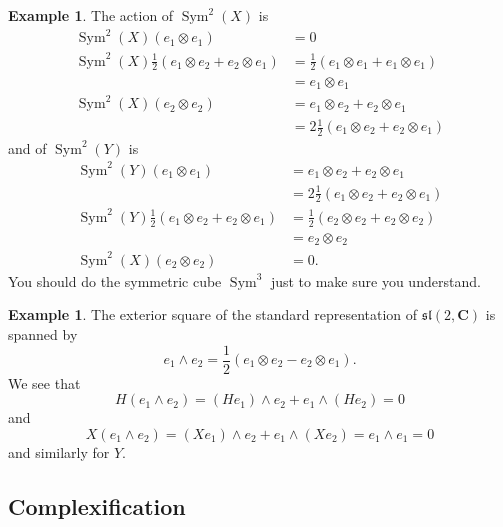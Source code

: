 \documentclass[12pt]{article}
\newcommand{\CC}{\mathbf{C}}
\newcommand{\OP}{\operatorname}
\newcommand{\Sym}{\OP{Sym}}
\theoremstyle{definition}
\newtheorem{exm}[thm]{Example}
\theoremstyle{check}
\theoremstyle{remark}
\theoremstyle{TheoremNum}
\begin{document}
\begin{exm}
The action of $\Sym^2(X)$ is
\begin{align*}
\Sym^2(X)(e_1\otimes e_1)&=0\\
\Sym^2(X)\frac{1}{2}(e_1\otimes e_2+e_2\otimes e_1)&=\frac{1}{2}(e_1\otimes e_1+e_1\otimes e_1)\\
&=e_1\otimes e_1\\
\Sym^2(X)(e_2\otimes e_2)&=e_1\otimes e_2+e_2\otimes e_1\\
&=2\frac{1}{2}(e_1\otimes e_2+e_2\otimes e_1)
\end{align*}
and of $\Sym^2(Y)$ is
\begin{align*}
\Sym^2(Y)(e_1\otimes e_1)&=e_1\otimes e_2+e_2\otimes e_1\\
&=2\frac{1}{2}(e_1\otimes e_2+e_2\otimes e_1)\\
\Sym^2(Y)\frac{1}{2}(e_1\otimes e_2+e_2\otimes e_1)&=\frac{1}{2}(e_2\otimes e_2+e_2\otimes e_2)\\
&=e_2\otimes e_2\\
\Sym^2(X)(e_2\otimes e_2)&=0.
\end{align*}
You should do the symmetric cube $\Sym^3$ just to make sure you understand.
\end{exm}
\begin{exm}
The exterior square of the standard representation of $\mathfrak{sl}(2,\CC)$ is spanned by
\[e_1\wedge e_2=\frac{1}{2}\left(e_1\otimes e_2-e_2\otimes e_1\right).\]
We see that
\[H(e_1\wedge e_2)=(He_1)\wedge e_2+e_1\wedge (He_2)=0\]
and
\[X(e_1\wedge e_2)=(Xe_1)\wedge e_2+e_1\wedge (Xe_2)=e_1\wedge e_1=0\]
and similarly for $Y$.
\end{exm}

\subsection{Complexification}
\end{document}
